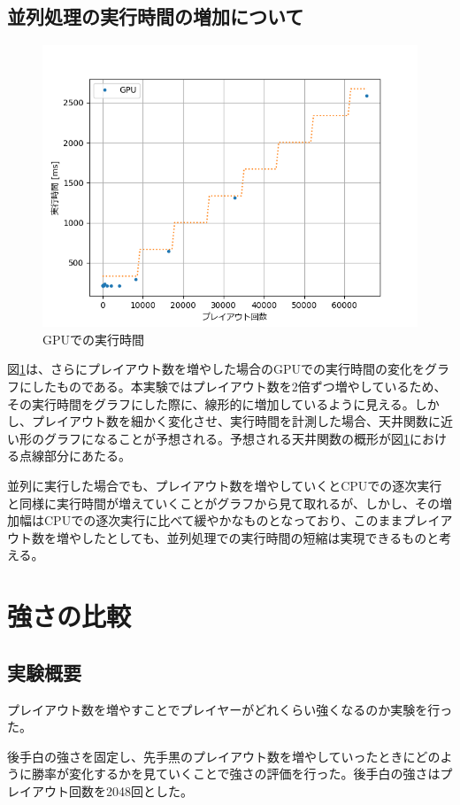 \documentclass[10pt, a4paper]{jsarticle}
\begin{document}
\subsection{並列処理の実行時間の増加について}
\begin{figure}[ht]
    \begin{center}
        \includegraphics[width=12cm]{img/gpu_time_wCeil.png}
        \caption{GPUでの実行時間}
        \label{fig:gpu_time}
    \end{center}
\end{figure}
\par 図\ref{fig:gpu_time}は、さらにプレイアウト数を増やした場合のGPUでの実行時間の変化をグラフにしたものである。本実験ではプレイアウト数を2倍ずつ増やしているため、その実行時間をグラフにした際に、線形的に増加しているように見える。しかし、プレイアウト数を細かく変化させ、実行時間を計測した場合、天井関数に近い形のグラフになることが予想される。予想される天井関数の概形が図\ref{fig:gpu_time}における点線部分にあたる。
\par 並列に実行した場合でも、プレイアウト数を増やしていくとCPUでの逐次実行と同様に実行時間が増えていくことがグラフから見て取れるが、しかし、その増加幅はCPUでの逐次実行に比べて緩やかなものとなっており、このままプレイアウト数を増やしたとしても、並列処理での実行時間の短縮は実現できるものと考える。
\section{強さの比較}
\subsection{実験概要}
プレイアウト数を増やすことでプレイヤーがどれくらい強くなるのか実験を行った。
\par 後手白の強さを固定し、先手黒のプレイアウト数を増やしていったときにどのように勝率が変化するかを見ていくことで強さの評価を行った。後手白の強さはプレイアウト回数を2048回とした。
\end{document}
